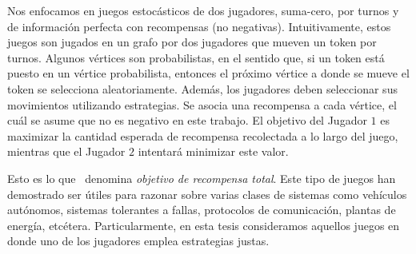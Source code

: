 	Nos enfocamos en juegos estocásticos de dos jugadores, suma-cero, por turnos y de información perfecta con recompensas (no negativas)\cite{FilarV96}. 
	Intuitivamente, estos juegos son jugados en un grafo por dos jugadores que mueven un token por turnos. Algunos vértices son probabilistas, en el sentido que, si un token está puesto en un vértice probabilista, entonces el próximo vértice a donde se mueve el token se selecciona aleatoriamente. Además, los jugadores deben seleccionar sus movimientos utilizando estrategias. Se asocia una recompensa a cada vértice, el cuál se asume que no es negativo en este trabajo. El objetivo del Jugador $1$ es maximizar la cantidad esperada de recompensa recolectada a lo largo del juego, mientras que el Jugador $2$ intentará minimizar este valor.
	
	Esto es lo que~\cite{SvorenovaKwiatkowska16} denomina \emph{objetivo de recompensa total}.
	Este tipo de juegos han demostrado ser útiles para razonar sobre varias clases de sistemas como vehículos autónomos, sistemas tolerantes a fallas, protocolos de comunicación, plantas de energía, etcétera.  %
        Particularmente, en esta tesis consideramos aquellos juegos en donde uno de los jugadores emplea estrategias justas.

